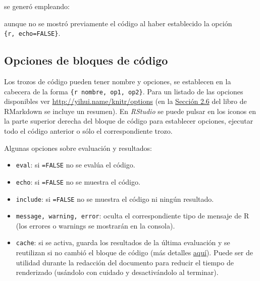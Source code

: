 \documentclass[
]{book}
\newenvironment{Shaded}{\begin{snugshade}}{\end{snugshade}}
\newcommand{\InformationTok}[1]{\textcolor[rgb]{0.56,0.35,0.01}{\textbf{\textit{#1}}}}
\providecommand{\tightlist}{%
  \setlength{\itemsep}{0pt}\setlength{\parskip}{0pt}}
\theoremstyle{break}
\theoremstyle{nonumberplain}
\begin{document}
se generó empleando:

\begin{Shaded}
\end{Shaded}

aunque no se mostró previamente el código al haber establecido la opción \texttt{\textasciigrave{}\textasciigrave{}\textasciigrave{}\{r,\ echo=FALSE\}}.

\hypertarget{opcodigo}{%
\subsection{Opciones de bloques de código}\label{opcodigo}}

Los trozos de código pueden tener nombre y opciones, se establecen en la cabecera de la forma
\texttt{\textasciigrave{}\textasciigrave{}\textasciigrave{}\{r\ nombre,\ op1,\ op2\}}.
Para un listado de las opciones disponibles ver \url{http://yihui.name/knitr/options}
(en la \href{https://bookdown.org/yihui/rmarkdown/r-code.html}{Sección 2.6} del libro de RMarkdown
se incluye un resumen).
En \emph{RStudio} se puede pulsar en los iconos en la parte superior derecha del bloque de código
para establecer opciones, ejecutar todo el código anterior o sólo el correspondiente trozo.

Algunas opciones sobre evaluación y resultados:

\begin{itemize}
\tightlist
\item
  \texttt{eval}: si \texttt{=FALSE} no se evalúa el código.
\item
  \texttt{echo}: si \texttt{=FALSE} no se muestra el código.
\item
  \texttt{include}: si \texttt{=FALSE} no se muestra el código ni ningún resultado.
\item
  \texttt{message,\ warning,\ error}: oculta el correspondiente tipo de mensaje de R
  (los errores o warnings se mostrarán en la consola).
\item
  \texttt{cache}: si se activa, guarda los resultados de la última evaluación
  y se reutilizan si no cambió el bloque de código
  (más detalles \href{https://yihui.name/knitr/options/\#cache}{aquí}).
  Puede ser de utilidad durante la redacción del documento para reducir el tiempo de renderizado
  (usándolo con cuidado y desactivándolo al terminar).
\end{itemize}
\end{document}
